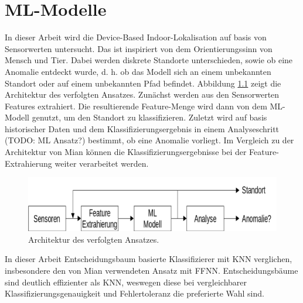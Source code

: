 \chapter{ML-Modelle}
In dieser Arbeit wird die Device-Based Indoor-Lokalisation auf basis von Sensorwerten untersucht.
Das ist inspiriert von dem Orientierungssinn von Mensch und Tier.
Dabei werden diskrete Standorte unterschieden, sowie ob eine Anomalie entdeckt wurde,
d. h. ob das Modell sich an einem unbekannten Standort oder auf einem unbekannten Pfad befindet.
\newline
\newline
Abbildung \ref{fig:model_idea} zeigt die Architektur des verfolgten Ansatzes.
Zunächst werden aus den Sensorwerten Features extrahiert.
Die resultierende Feature-Menge wird dann von dem ML-Modell genutzt, um den Standort zu klassifizieren.
Zuletzt wird auf basis historischer Daten und dem Klassifizierungsergebnis in einem Analyseschritt (TODO: ML Ansatz?) bestimmt, ob eine Anomalie vorliegt.
Im Vergleich zu der Architektur von Mian \cite{naveedThesis} können die Klassifizierungsergebnisse bei der Feature-Extrahierung weiter verarbeitet werden.
\begin{figure}[h!]
    \centering
    \includegraphics[width=\linewidth]{images/model_idea.png}
    \caption{Architektur des verfolgten Ansatzes.}
    \label{fig:model_idea}
\end{figure}
\newline
In dieser Arbeit Entscheidungsbaum basierte Klassifizierer mit KNN verglichen, insbesondere den von Mian verwendeten Ansatz mit FFNN.
Entscheidungsbäume sind deutlich effizienter als KNN, weswegen diese bei vergleichbarer Klassifizierungsgenauigkeit und Fehlertoleranz die preferierte Wahl sind.

